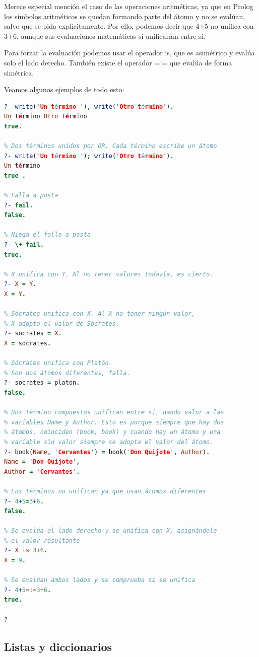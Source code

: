 \documentclass[12pt]{report} %
\begin{document}
Merece especial mención el caso de las operaciones aritméticas, ya que en Prolog los símbolos aritméticos se quedan formando parte del átomo y no se evalúan, salvo que se pida explícitamente. Por ello, podemos decir que 4+5 no unifica con 3+6, aunque sus evaluaciones matemáticas sí unificarían entre sí.

Para forzar la evaluación podemos usar el operador is, que es asimétrico y evalúa solo el lado derecho. También existe el operador =:= que evalúa de forma simétrica.

Veamos algunos ejemplos de todo esto:
\begin{lstlisting}[language=Prolog]
% Dos términos unidos por AND. Cada término escribe un átomo
?- write('Un término '), write('Otro término').
Un término Otro término
true.

% Dos términos unidos por OR. Cada término escribe un átomo
?- write('Un término '); write('Otro término').
Un término 
true .

% Falla a posta
?- fail.
false.

% Niega el fallo a posta
?- \+ fail.
true.

% X unifica con Y. Al no tener valores todavía, es cierto.
?- X = Y.
X = Y.

% Sócrates unifica con X. Al X no tener ningún valor, 
% X adopta el valor de Sócrates. 
?- socrates = X.
X = socrates.

% Sócrates unifica con Platón.
% Son dos átomos diferentes, falla.
?- socrates = platon.
false.

% Dos término compuestos unifican entre sí, dando valor a las
% variables Name y Author. Esto es porque siempre que hay dos
% átomos, coinciden (book, book) y cuando hay un átomo y una 
% variable sin valor siempre se adopta el valor del átomo.
?- book(Name, 'Cervantes') = book('Don Quijote', Author).
Name = 'Don Quijote',
Author = 'Cervantes'.

% Los términos no unifican ya que usan átomos diferentes
?- 4+5=3+6.
false.

% Se evalúa el lado derecho y se unifica con X, asignándole
% el valor resultante
?- X is 3+6.
X = 9.

% Se evalúan ambos lados y se comprueba si se unifica
?- 4+5=:=3+6.
true.

?- 
\end{lstlisting}

\subsection{Listas y diccionarios}
\end{document}
